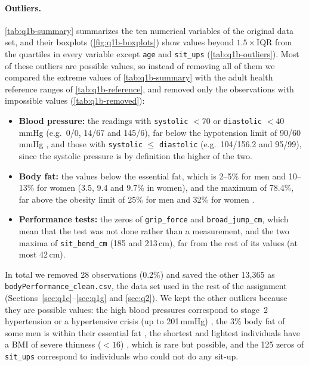 
\paragraph{Outliers.} \autoref{tab:q1b-summary} summarizes the ten numerical variables of the original data set, and their boxplots (\autoref{fig:q1b-boxplots}) show values beyond $1.5 \times \mathrm{IQR}$ from the quartiles in every variable except \texttt{age} and \texttt{sit\_ups} (\autoref{tab:q1b-outliers}).
Most of these outliers are possible values, so instead of removing all of them we compared the extreme values of \autoref{tab:q1b-summary} with the adult health reference ranges of \autoref{tab:q1b-reference}, and removed only the observations with impossible values (\autoref{tab:q1b-removed}):

\begin{itemize}
  \item \textbf{Blood pressure:} the readings with \texttt{systolic} $< 70$ or \texttt{diastolic} $< 40$\,mmHg (e.g.\ 0/0, 14/67 and 145/6), far below the hypotension limit of 90/60\,mmHg \citep{nhs_hypotension}, and those with \texttt{systolic} $\leq$ \texttt{diastolic} (e.g.\ 104/156.2 and 95/99), since the systolic pressure is by definition the higher of the two.
  \item \textbf{Body fat:} the values below the essential fat, which is 2--5\% for men and 10--13\% for women (3.5, 9.4 and 9.7\% in women), and the maximum of 78.4\%, far above the obesity limit of 25\% for men and 32\% for women \citep{ace_bodyfat}.
  \item \textbf{Performance tests:} the zeros of \texttt{grip\_force} and \texttt{broad\_jump\_cm}, which mean that the test was not done rather than a measurement, and the two maxima of \texttt{sit\_bend\_cm} (185 and 213\,cm), far from the rest of its values (at most 42\,cm).
\end{itemize}

In total we removed 28 observations (0.2\%) and saved the other 13,365 as \texttt{bodyPerformance\_clean.csv}, the data set used in the rest of the assignment (Sections~\ref{sec:q1c}--\ref{sec:q1g} and \ref{sec:q2}).
We kept the other outliers because they are possible values: the high blood pressures correspond to stage~2 hypertension or a hypertensive crisis (up to 201\,mmHg) \citep{whelton2018}, the 3\% body fat of some men is within their essential fat \citep{ace_bodyfat}, the shortest and lightest individuals have a BMI of severe thinness ($< 16$) \citep{who1995}, which is rare but possible, and the 125 zeros of \texttt{sit\_ups} correspond to individuals who could not do any sit-up.

